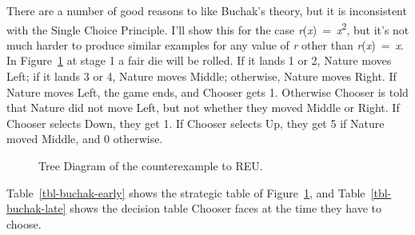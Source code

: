 \documentclass[
  10pt,
  letterpaper,
  DIV=11,
  numbers=noendperiod,
  twoside]{scrartcl}
\begin{document}
There are a number of good reasons to like Buchak's theory, but it is
inconsistent with the Single Choice Principle. I'll show this for the
case \emph{r}(\emph{x})~=~\emph{x}\textsuperscript{2}, but it's not much
harder to produce similar examples for any value of \emph{r} other than
\emph{r}(\emph{x})~=~\emph{x}. In Figure~\ref{fig-buchak} at stage 1 a
fair die will be rolled. If it lands 1 or 2, Nature moves Left; if it
lands 3 or 4, Nature moves Middle; otherwise, Nature moves Right. If
Nature moves Left, the game ends, and Chooser gets 1. Otherwise Chooser
is told that Nature did not move Left, but not whether they moved Middle
or Right. If Chooser selects Down, they get 1. If Chooser selects Up,
they get 5 if Nature moved Middle, and 0 otherwise.

\begin{figure}


\caption{\label{fig-buchak}Tree Diagram of the counterexample to REU.}

\end{figure}%

Table~\ref{tbl-buchak-early} shows the strategic table of
Figure~\ref{fig-buchak}, and Table~\ref{tbl-buchak-late} shows the
decision table Chooser faces at the time they have to choose.
\end{document}
